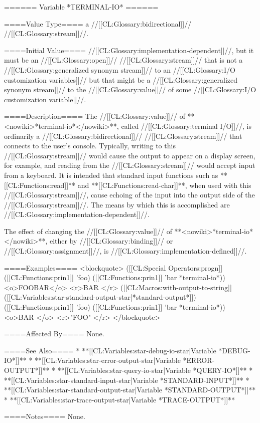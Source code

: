 ====== Variable *TERMINAL-IO* ======

====Value Type====
a //[[CL:Glossary:bidirectional]]// //[[CL:Glossary:stream]]//.

====Initial Value====
//[[CL:Glossary:implementation-dependent]]//, but it must be an //[[CL:Glossary:open]]// //[[CL:Glossary:stream]]// that is not a //[[CL:Glossary:generalized synonym stream]]// to an //[[CL:Glossary:I/O customization variables]]// but that might be a //[[CL:Glossary:generalized synonym stream]]// to the //[[CL:Glossary:value]]// of some //[[CL:Glossary:I/O customization variable]]//.

====Description====
The //[[CL:Glossary:value]]// of **<nowiki>*terminal-io*</nowiki>**, called //[[CL:Glossary:terminal I/O]]//, is ordinarily a //[[CL:Glossary:bidirectional]]// //[[CL:Glossary:stream]]// that connects to the user's console. Typically, writing to this //[[CL:Glossary:stream]]// would cause the output to appear on a display screen, for example, and reading from the //[[CL:Glossary:stream]]// would accept input from a keyboard. It is intended that standard input functions such as **[[CL:Functions:read]]** and **[[CL:Functions:read-char]]**, when used with this //[[CL:Glossary:stream]]//, cause echoing of the input into the output side of the //[[CL:Glossary:stream]]//. The means by which this is accomplished are //[[CL:Glossary:implementation-dependent]]//.

The effect of changing the //[[CL:Glossary:value]]// of **<nowiki>*terminal-io*</nowiki>**, either by //[[CL:Glossary:binding]]// or //[[CL:Glossary:assignment]]//, is //[[CL:Glossary:implementation-defined]]//.

====Examples====
<blockquote> 
([[CL:Special Operators:progn]] 
  ([[CL:Functions:prin1]] 'foo) 
  ([[CL:Functions:prin1]] 'bar *terminal-io*))
<o>FOOBAR</o> 
<r>BAR </r>
([[CL:Macros:with-output-to-string]] ([[CL:Variables:star-standard-output-star|*standard-output*]]) 
  ([[CL:Functions:prin1]] 'foo) 
  ([[CL:Functions:prin1]] 'bar *terminal-io*))
<o>BAR </o>
<r>"FOO" </r>
</blockquote>

====Affected By====
None.

====See Also====
  * **[[CL:Variables:star-debug-io-star|Variable *DEBUG-IO*]]**
  * **[[CL:Variables:star-error-output-star|Variable *ERROR-OUTPUT*]]**
  * **[[CL:Variables:star-query-io-star|Variable *QUERY-IO*]]**
  * **[[CL:Variables:star-standard-input-star|Variable *STANDARD-INPUT*]]**
  * **[[CL:Variables:star-standard-output-star|Variable *STANDARD-OUTPUT*]]**
  * **[[CL:Variables:star-trace-output-star|Variable *TRACE-OUTPUT*]]**

====Notes====
None.

